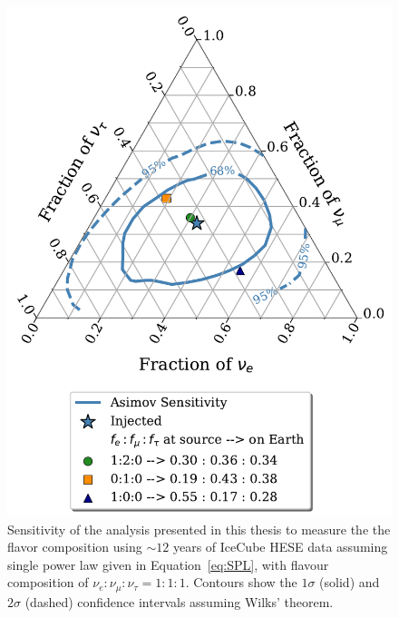 \begin{figure}[h!]
    \caption{Sensitivity of the analysis presented in this thesis to measure the the flavor composition using $\sim12$ years of IceCube HESE data assuming single power law given in Equation~\ref{eq:SPL}, with flavour composition of $\nu_e:\nu_{\mu}:\nu_{\tau}=1:1:1$. Contours show the $1\sigma$ (solid) and $2\sigma$ (dashed) confidence intervals assuming Wilks' theorem.}
    \includegraphics{./figures/Analysis/Asimov_Sensitivity.pdf}
\end{figure}

